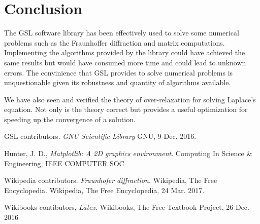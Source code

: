 \documentclass{article}
\begin{document}
\section{Conclusion}

The GSL software library has been effectively used to solve some numerical problems such as the Fraunhoffer diffraction and matrix computations. Implementing the algorithms
provided by the library could have achieved the same results but would have consumed more time and could lead to unknown errors. The convinience that GSL provides to solve numerical
problems is unquestionable given its robustness and quantity of algorithms available.

We have also seen and verified the theory of over-relaxation for solving Laplace's equation. Not only is the theory correct but provides a useful optimization for speeding up the convergence
of a solution.

\begin{thebibliography}{9}

   GSL contributors. \emph{GNU Scientific Library} GNU, 9 Dec. 2016.

     Hunter, J. D.,
     \emph{Matplotlib: A 2D graphics environment}. Computing In Science \& Engineering, IEEE COMPUTER SOC

     Wikipedia contributors. \emph{Fraunhofer diffraction}. Wikipedia, The Free Encyclopedia. Wikipedia, The Free Encyclopedia, 24 Mar. 2017.

	  Wikibooks contibutors,
	  \emph{Latex}. Wikibooks, The Free Textbook Project, 26 Dec. 2016



\end{thebibliography}
\end{document}
